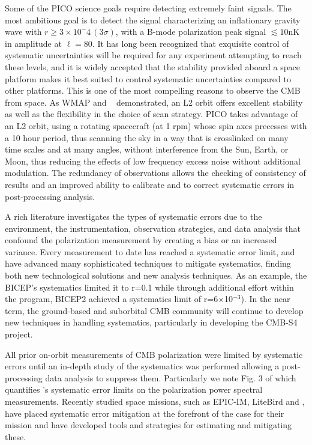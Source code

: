 \documentclass[PICOReport.tex]{subfiles}
\begin{document}
Some of the PICO science goals require detecting extremely faint signals. The most ambitious goal is to detect the  
signal characterizing an inflationary gravity wave with $r \geq 3\times{10^-4} \, (3\sigma) $, with a B-mode polarization peak signal $\lesssim10$nK in amplitude at $\ell=80$.
It has long been recognized that exquisite control of systematic uncertainties will be required for any experiment attempting 
to reach these levels, and it is widely accepted that the stability provided aboard a space platform makes it best suited to
control systematic uncertainties compared to other platforms. This is one of the most compelling reasons to observe the 
CMB from space.  As WMAP and \planck~ demonstrated, an L2 orbit offers excellent stability as well 
as the flexibility in the choice of scan strategy.  
PICO takes advantage of an L2 orbit, using a rotating spacecraft (at 1 rpm) whose spin axes precesses with a 10 hour period, thus scanning the sky in a way that is crosslinked on many time scales and at many angles, without interference from the Sun, Earth, or Moon, thus reducing the effects of low frequency excess noise without additional modulation. 
The redundancy of observations allows the checking of consistency of results and an improved ability to calibrate and to correct systematic errors in post-processing analysis.

A rich literature investigates the types of systematic errors due to the environment, the instrumentation, observation strategies, and data analysis that confound the polarization measurement by creating a bias or an increased variance\cite{hu03,shimon2008,yadav2010}. 
Every measurement to date has  reached a systematic error limit, and have advanced many sophisticated techniques to mitigate systematics, finding both new technological solutions and new analysis techniques.
As an example, the BICEP's systematics limited it to r=0.1\cite{Takahashi2010} while through additional effort within the program, BICEP2 achieved a systematics limit of r=6$\times$10$^{-3}$\cite{BICEP2_III}).
In the near term, the ground-based and suborbital CMB community will continue to develop new techniques in handling systematics, particularly in developing the CMB-S4 project.

All prior on-orbit measurements of CMB polarization were limited by systematic errors until an in-depth study of the systematics was performed allowing a post-processing data analysis to suppress them\cite{Bennett13,planck2016_xlvi,Planck2018_I}. 
Particularly we note Fig. 3 of \cite{Planck2018_I} which quantifies \planck's systematic error limits on the polarization power spectral measurements.
Recently studied space missions, such as EPIC-IM, LiteBird and  \core, have placed
systematic error mitigation at the forefront of the case for their
mission and have developed tools and strategies for estimating and mitigating these\cite{hazumi2012,wallis2017,Natoli2018}.
\end{document}
